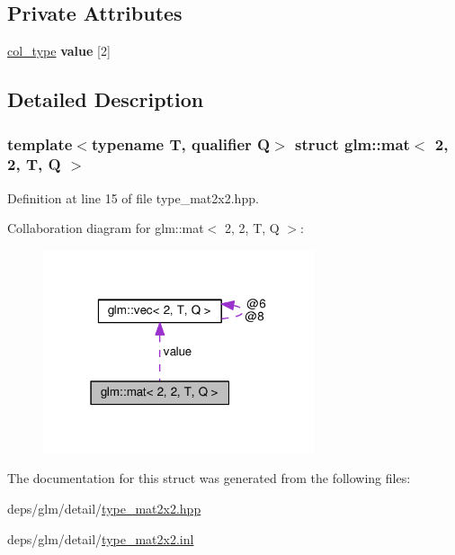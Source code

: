\subsection*{Private Attributes}
\begin{DoxyCompactItemize}
\item 
\mbox{\label{structglm_1_1mat_3_012_00_012_00_01T_00_01Q_01_4_a68d5d8eb032c2089e37ffe09c786da80}} 
\hyperlink{structglm_1_1vec_3_012_00_01T_00_01Q_01_4}{col\+\_\+type} {\bfseries value} \mbox{[}2\mbox{]}
\end{DoxyCompactItemize}


\subsection{Detailed Description}
\subsubsection*{template$<$typename T, qualifier Q$>$\newline
struct glm\+::mat$<$ 2, 2, T, Q $>$}



Definition at line 15 of file type\+\_\+mat2x2.\+hpp.



Collaboration diagram for glm\+:\+:mat$<$ 2, 2, T, Q $>$\+:
\nopagebreak
\begin{figure}[H]
\begin{center}
\leavevmode
\includegraphics[width=226pt]{de/d8f/structglm_1_1mat_3_012_00_012_00_01T_00_01Q_01_4__coll__graph}
\end{center}
\end{figure}


The documentation for this struct was generated from the following files\+:\begin{DoxyCompactItemize}
\item 
deps/glm/detail/\hyperlink{type__mat2x2_8hpp}{type\+\_\+mat2x2.\+hpp}\item 
deps/glm/detail/\hyperlink{type__mat2x2_8inl}{type\+\_\+mat2x2.\+inl}\end{DoxyCompactItemize}
